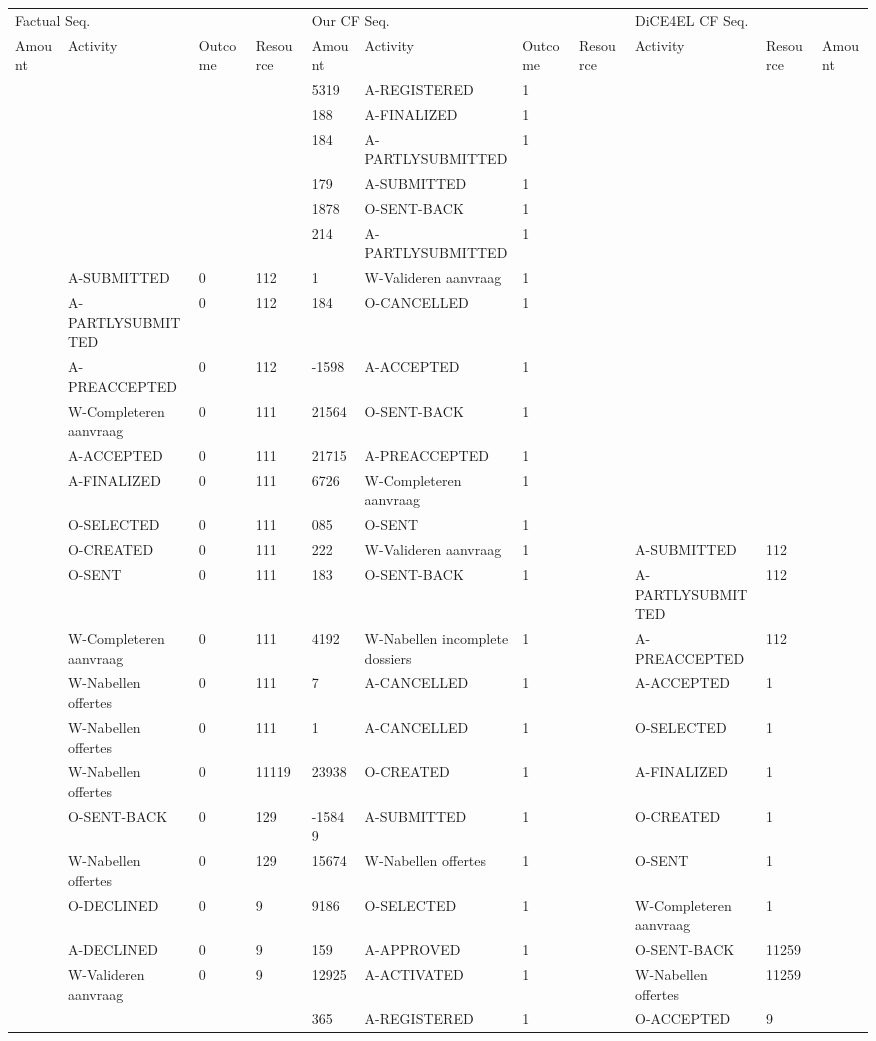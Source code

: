 \begin{tabular}{lllllllllll}
\toprule
\multicolumn{4}{l}{Factual Seq.} & \multicolumn{4}{l}{Our CF Seq.} & \multicolumn{3}{l}{DiCE4EL CF Seq.} \\
Amount & Activity & Outcome & Resource & Amount & Activity & Outcome & Resource & Activity & Resource & Amount \\
\midrule
 &  &  &  & 5319 & A-REGISTERED & 1 &  &  &  &  \\
 &  &  &  & 188 & A-FINALIZED & 1 &  &  &  &  \\
 &  &  &  & 184 & A-PARTLYSUBMITTED & 1 &  &  &  &  \\
 &  &  &  & 179 & A-SUBMITTED & 1 &  &  &  &  \\
 &  &  &  & 1878 & O-SENT-BACK & 1 &  &  &  &  \\
 &  &  &  & 214 & A-PARTLYSUBMITTED & 1 &  &  &  &  \\
 & A-SUBMITTED & 0 & 112 & 1 & W-Valideren aanvraag & 1 &  &  &  &  \\
 & A-PARTLYSUBMITTED & 0 & 112 & 184 & O-CANCELLED & 1 &  &  &  &  \\
 & A-PREACCEPTED & 0 & 112 & -1598 & A-ACCEPTED & 1 &  &  &  &  \\
 & W-Completeren aanvraag & 0 & 111 & 21564 & O-SENT-BACK & 1 &  &  &  &  \\
 & A-ACCEPTED & 0 & 111 & 21715 & A-PREACCEPTED & 1 &  &  &  &  \\
 & A-FINALIZED & 0 & 111 & 6726 & W-Completeren aanvraag & 1 &  &  &  &  \\
 & O-SELECTED & 0 & 111 & 085 & O-SENT & 1 &  &  &  &  \\
 & O-CREATED & 0 & 111 & 222 & W-Valideren aanvraag & 1 &  & A-SUBMITTED & 112 &  \\
 & O-SENT & 0 & 111 & 183 & O-SENT-BACK & 1 &  & A-PARTLYSUBMITTED & 112 &  \\
 & W-Completeren aanvraag & 0 & 111 & 4192 & W-Nabellen incomplete dossiers & 1 &  & A-PREACCEPTED & 112 &  \\
 & W-Nabellen offertes & 0 & 111 & 7 & A-CANCELLED & 1 &  & A-ACCEPTED & 1 &  \\
 & W-Nabellen offertes & 0 & 111 & 1 & A-CANCELLED & 1 &  & O-SELECTED & 1 &  \\
 & W-Nabellen offertes & 0 & 11119 & 23938 & O-CREATED & 1 &  & A-FINALIZED & 1 &  \\
 & O-SENT-BACK & 0 & 129 & -15849 & A-SUBMITTED & 1 &  & O-CREATED & 1 &  \\
 & W-Nabellen offertes & 0 & 129 & 15674 & W-Nabellen offertes & 1 &  & O-SENT & 1 &  \\
 & O-DECLINED & 0 & 9 & 9186 & O-SELECTED & 1 &  & W-Completeren aanvraag & 1 &  \\
 & A-DECLINED & 0 & 9 & 159 & A-APPROVED & 1 &  & O-SENT-BACK & 11259 &  \\
 & W-Valideren aanvraag & 0 & 9 & 12925 & A-ACTIVATED & 1 &  & W-Nabellen offertes & 11259 &  \\
 &  &  &  & 365 & A-REGISTERED & 1 &  & O-ACCEPTED & 9 &  \\
\bottomrule
\end{tabular}
